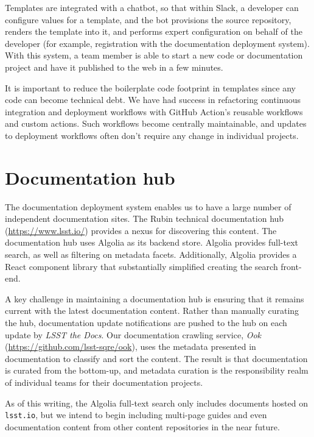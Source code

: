 \documentclass[11pt,twoside]{article}
\begin{document}
Templates are integrated with a chatbot, so that within Slack, a developer can configure values for a template, and the bot provisions the source repository, renders the template into it, and performs expert configuration on behalf of the developer (for example, registration with the documentation deployment system).
With this system, a team member is able to start a new code or documentation project and have it published to the web in a few minutes.

It is important to reduce the boilerplate code footprint in templates since any code can become technical debt.
We have had success in refactoring continuous integration and deployment workflows with GitHub Action's reusable workflows and custom actions.
Such workflows become centrally maintainable, and updates to deployment workflows often don't require any change in individual projects.

\label{sec:hub}
\section{Documentation hub}

The documentation deployment system enables us to have a large number of independent documentation sites.
The Rubin technical documentation hub (\url{https://www.lsst.io/}) provides a nexus for discovering this content.
The documentation hub uses Algolia as its backend store.
Algolia provides full-text search, as well as filtering on metadata facets.
Additionally, Algolia provides a React component library that substantially simplified creating the search front-end.

A key challenge in maintaining a documentation hub is ensuring that it remains current with the latest documentation content.
Rather than manually curating the hub, documentation update notifications are pushed to the hub on each update by \textit{LSST the Docs}.
Our documentation crawling service, \textit{Ook} (\url{https://github.com/lsst-sqre/ook}), uses the metadata presented in documentation to classify and sort the content.
The result is that documentation is curated from the bottom-up, and metadata curation is the responsibility realm of individual teams for their documentation projects.

As of this writing, the Algolia full-text search only includes documents hosted on \texttt{lsst.io}, but we intend to begin including multi-page guides and even documentation content from other content repositories in the near future.
\end{document}
